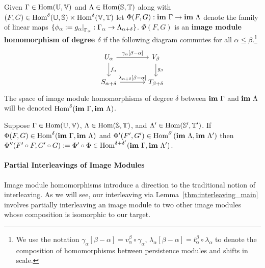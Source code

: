 \begin{definition}
  Given $\Gamma\in\mathrm{Hom}(\mathbb{U},\mathbb{V})$ and $\Lambda\in\mathrm{Hom}(\mathbb{S},\mathbb{T})$ along with $(F,G)\in\mathrm{Hom}^\delta(\mathbb{U},\mathbb{S})\times\mathrm{Hom}^\delta(\mathbb{V},\mathbb{T})$ let $\Phi(F, G) : \mathbf{im}~\Gamma\to\mathbf{im}~\Lambda$ denote the family of linear maps $\{\phi_\alpha := g_\alpha\mathord{\mid}_{\Gamma_\alpha} : \Gamma_\alpha\to\Lambda_{\alpha+\delta}\}$.
  $\Phi(F, G)$ is an \textbf{image module homomorphism of degree $\delta$} if the following diagram commutes for all $\alpha\leq\beta$.\footnote{We use the notation $\gamma_\alpha[\beta-\alpha] = v_\alpha^\beta\circ\gamma_\alpha$, $\lambda_\alpha[\beta-\alpha] = t_\alpha^\beta\circ\lambda_\alpha$ to denote the composition of homomorphisms between persistence modules and shifts in scale.}
  \begin{equation}\label{dgm:image_homomorphism}
    \begin{tikzcd}[column sep=large]
        U_\alpha\arrow{r}{\gamma_\alpha[\beta-\alpha]}\arrow{d}{f_\alpha} &
      V_\beta\arrow{d}{g_\beta}\\
      S_{\alpha+\delta}\arrow{r}{\lambda_{\alpha+\delta}[\beta-\alpha]} &
      T_{\beta +\delta}
  \end{tikzcd}\end{equation}
  The space of image module homomorphisms of degree $\delta$ between $\mathbf{im}~\Gamma$ and $\mathbf{im}~\Lambda$ will be denoted $\mathrm{Hom}^\delta(\mathbf{im}~\Gamma,\mathbf{im}~\Lambda)$.
\end{definition}

\begin{lemma}\label{lem:image_composition}
  Suppose $\Gamma\in\mathrm{Hom}(\mathbb{U},\mathbb{V})$, $\Lambda\in\mathrm{Hom}(\mathbb{S},\mathbb{T})$, and $\Lambda'\in\mathrm{Hom}(\mathbb{S}',\mathbb{T}')$.
  If $\Phi(F, G)\in\mathrm{Hom}^\delta(\mathbf{im}~\Gamma, \mathbf{im}~\Lambda)$ and $\Phi'(F', G')\in\mathrm{Hom}^{\delta'}(\mathbf{im}~\Lambda, \mathbf{im}~\Lambda')$ then $\Phi''(F'\circ F, G'\circ G) := \Phi'\circ\Phi\in\mathrm{Hom}^{\delta+\delta'}(\mathbf{im}~\Gamma,\mathbf{im}~\Lambda')$.
\end{lemma}

\paragraph*{Partial Interleavings of Image Modules}

Image module homomorphisms introduce a direction to the traditional notion of interleaving.
As we will see, our interleaving via Lemma~\ref{thm:interleaving_main} involves partially interleaving an image module to two other image modules whose composition is isomorphic to our target.

